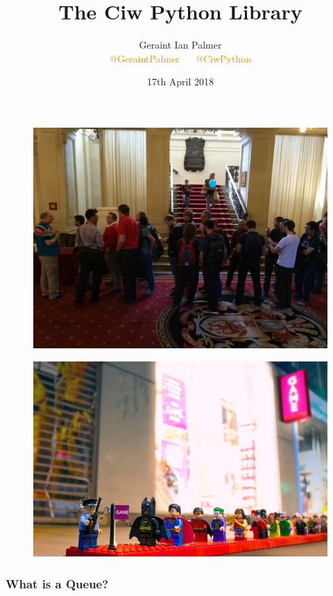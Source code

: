 \documentclass{beamer}
\title{The Ciw Python Library}
\author{Geraint Ian Palmer\\ \textcolor{darkorange}{@GeraintPalmer} $\quad$ \textcolor{darkorange}{@CiwPython}}
\date{17th April 2018}
\begin{document}
\frame{\titlepage}


\begin{frame}
\begin{figure}
    \includegraphics[width=\textwidth]{pyconqueue}
\end{figure}
\end{frame}

\begin{frame}
\begin{figure}
    \includegraphics[width=\textwidth]{legoqueue}
\end{figure}
\end{frame}

\begin{frame}
\frametitle{What is a Queue?}
\begin{figure}
  
\end{figure}
\end{frame}
\end{document}
